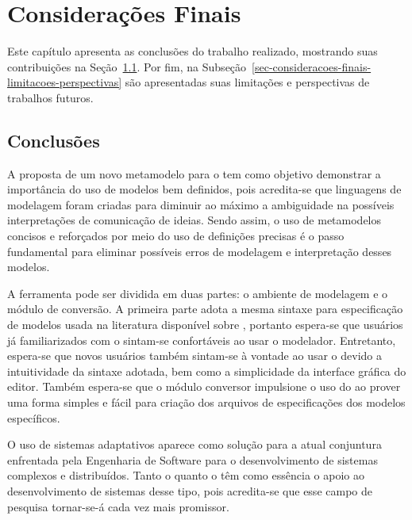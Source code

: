 \chapter{Considerações Finais}
\label{sec-conclusoes}

Este capítulo apresenta as conclusões do trabalho realizado, mostrando suas contribuições na Seção~\ref{sec-consideracoes-finais-conclusoes}. Por fim, na Subseção~\ref{sec-consideracoes-finais-limitacoes-perspectivas} são apresentadas suas limitações e perspectivas de trabalhos futuros.

\section{Conclusões}
\label{sec-consideracoes-finais-conclusoes}

A proposta de um novo metamodelo para o \zanshin tem como objetivo demonstrar a importância do uso de modelos bem definidos, pois acredita-se que linguagens de modelagem foram criadas para diminuir ao máximo a ambiguidade na possíveis interpretações de comunicação de ideias. Sendo assim, o uso de metamodelos concisos e reforçados por meio do uso de definições precisas é o passo fundamental para eliminar possíveis erros de modelagem e interpretação desses modelos.

A ferramenta \unagi pode ser dividida em duas partes: o ambiente de modelagem e o módulo de conversão. A primeira parte adota a mesma sintaxe para especificação de modelos usada na literatura disponível sobre \zanshin, portanto espera-se que usuários já familiarizados com o \framework sintam-se confortáveis ao usar o modelador. Entretanto, espera-se que novos usuários também sintam-se à vontade ao usar o \unagi devido a intuitividade da sintaxe adotada, bem como a simplicidade da interface gráfica do editor. Também espera-se que o módulo conversor impulsione o uso do \zanshin ao prover uma forma simples e fácil para criação dos arquivos de especificações dos modelos específicos. 

O uso de sistemas adaptativos aparece como solução para a atual conjuntura enfrentada pela Engenharia de Software para o desenvolvimento de sistemas complexos e distribuídos. Tanto o \zanshin quanto o \unagi têm como essência o apoio ao desenvolvimento de sistemas desse tipo, pois acredita-se que esse campo de pesquisa tornar-se-á cada vez mais promissor.


